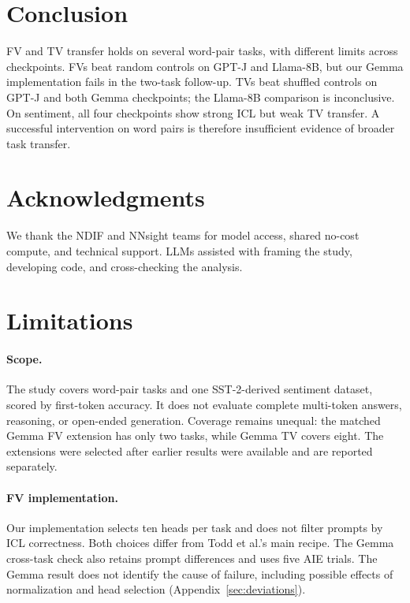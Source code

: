 \documentclass[11pt]{article}
\begin{document}
\section{Conclusion}
\label{sec:conclusion}

FV and TV transfer holds on several word-pair tasks, with different limits across checkpoints. FVs beat random controls on GPT-J and Llama-8B, but our Gemma implementation fails in the two-task follow-up. TVs beat shuffled controls on GPT-J and both Gemma checkpoints; the Llama-8B comparison is inconclusive. On sentiment, all four checkpoints show strong ICL but weak TV transfer. A successful intervention on word pairs is therefore insufficient evidence of broader task transfer.

\section*{Acknowledgments}

We thank the NDIF and NNsight teams for model access, shared no-cost compute, and technical support. LLMs assisted with framing the study, developing code, and cross-checking the analysis.

\section*{Limitations}

\paragraph{Scope.} The study covers word-pair tasks and one SST-2-derived sentiment dataset, scored by first-token accuracy. It does not evaluate complete multi-token answers, reasoning, or open-ended generation. Coverage remains unequal: the matched Gemma FV extension has only two tasks, while Gemma TV covers eight. The extensions were selected after earlier results were available and are reported separately.

\paragraph{FV implementation.} Our implementation selects ten heads per task and does not filter prompts by ICL correctness. Both choices differ from Todd et al.'s main recipe. The Gemma cross-task check also retains prompt differences and uses five AIE trials. The Gemma result does not identify the cause of failure, including possible effects of normalization and head selection (Appendix~\ref{sec:deviations}).
\end{document}
